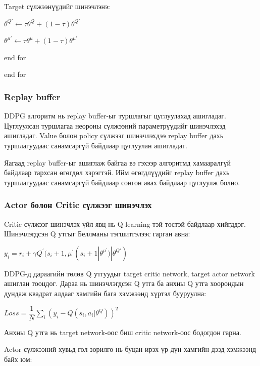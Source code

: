 \documentclass[12pt,A4]{report}
\begin{document}
\quad\quad Target сүлжээнүүдийг шинэчлэнэ:
\begin{center}
$\theta^{Q{'}} \longleftarrow \tau\theta^Q + (1-\tau)\theta^{Q{'}}$ 

$\theta^{\mu{'}} \longleftarrow \tau\theta^\mu + (1-\tau)\theta^{\mu{'}}$ 
\end{center}

\quad\quad end for

\quad end for

\subsubsection{Replay buffer}

DDPG алгоритм нь replay buffer-ыг туршлагыг цуглуулахад ашигладаг. Цуглуулсан туршлагаа неороны сүлжээний параметрүүдийг шинэчлэхэд ашигладаг. Value болон policy сүлжээг шинэчлэхдээ replay buffer дахь туршлагуудаас санамсаргүй байдлаар цуглуулан ашигладаг.

Яагаад replay buffer-ыг ашиглаж байгаа вэ гэхээр алгоритмд хамааралгүй байдлаар тархсан өгөгдөл хэрэгтэй. Ийм өгөгдлүүдийг replay buffer дахь туршлагуудаас санамсаргүй байдлаар сонгон авах байдлаар цуглуулж болно.

\subsubsection{Actor болон Critic сүлжээг шинэчлэх}

Critic сүлжээг шинэчлэх үйл явц нь Q-learning-тэй төстэй байдлаар хийгддэг. Шинэчлэгдсэн Q утгыг Беллманы тэгшитгэлээс гарган авна:

\begin{center}
$y_i=r_i+\gamma{Q^{'}}(s_i+1,\mu^{'}(s_i+1|\theta^{\mu^{'}})|\theta^{Q{'}})$
\end{center}

DDPG-д дараагийн төлөв Q утгуудыг target critic network, target actor network ашиглан тооцдог. Дараа нь шинэчлэгдсэн Q утга ба анхны Q утга хоорондын дундаж квадрат алдааг хамгийн бага хэмжээнд хүртэл бууруулна:

\begin{center}
$Loss = \dfrac{1}{N}\sum_{i}(y_i-Q(s_i,a_i|\theta^Q))^2$
\end{center}

Анхны Q утга нь target network-оос биш critic network-оос бодогдон гарна. 

Actor сүлжээний хувьд гол зорилго нь буцан ирэх үр дүн хамгийн дээд хэмжээнд байх юм:
\end{document}
